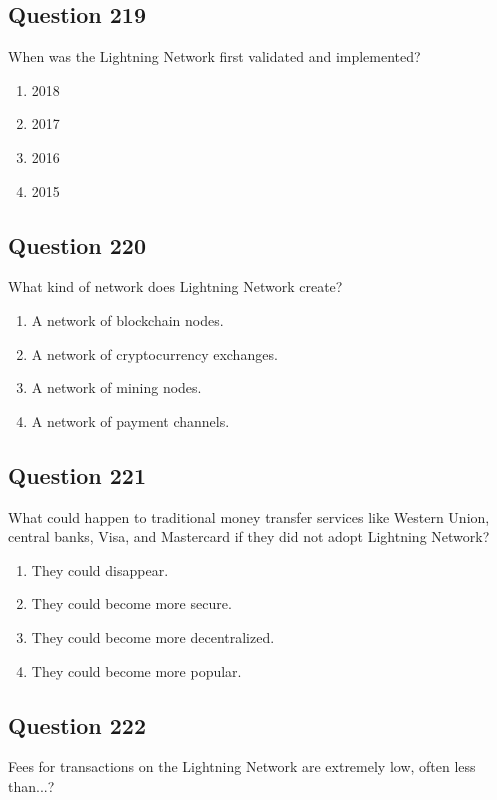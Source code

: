 \documentclass[12pt,a4paper]{article}
\begin{document}
\bigskip


\subsection*{Question 219}
When was the Lightning Network first validated and implemented?

\begin{enumerate}[label=\Alph*., leftmargin=*]
\item 2018
\item 2017
\item 2016
\item 2015
\end{enumerate}

\bigskip


\subsection*{Question 220}
What kind of network does Lightning Network create?

\begin{enumerate}[label=\Alph*., leftmargin=*]
\item A network of blockchain nodes.
\item A network of cryptocurrency exchanges.
\item A network of mining nodes.
\item A network of payment channels.
\end{enumerate}

\bigskip


\subsection*{Question 221}
What could happen to traditional money transfer services like Western Union, central banks, Visa, and Mastercard if they did not adopt Lightning Network?

\begin{enumerate}[label=\Alph*., leftmargin=*]
\item They could disappear.
\item They could become more secure.
\item They could become more decentralized.
\item They could become more popular.
\end{enumerate}

\bigskip


\subsection*{Question 222}
Fees for transactions on the Lightning Network are extremely low, often less than...?
\end{document}
